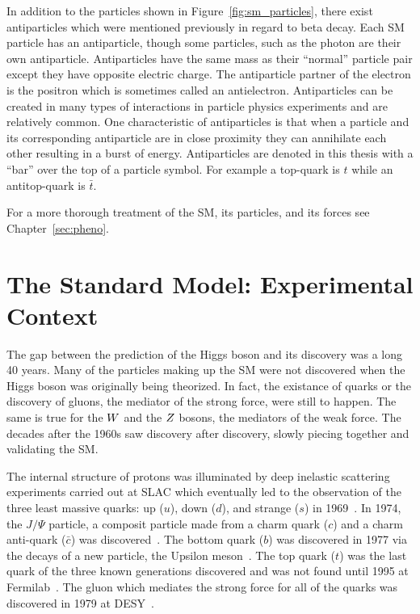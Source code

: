 In addition to the particles shown in Figure~\ref{fig:sm_particles}, there exist antiparticles
which were mentioned previously in regard to beta decay.
Each SM particle has an antiparticle, though some particles, such as the photon
are their own antiparticle. Antiparticles have the same mass as their
``normal'' particle pair except they have opposite electric charge. The antiparticle
partner of the electron is the positron which is sometimes called an antielectron.
Antiparticles can be created in many types of interactions in particle physics experiments
and are relatively common. One characteristic of antiparticles is that when a particle and its 
corresponding antiparticle are in close proximity they can annihilate each other resulting in
a burst of energy.
Antiparticles are denoted in this thesis with a ``bar'' over the top of a particle symbol. For example
a top-quark is $t$ while an antitop-quark is $\bar{t}$.

For a more thorough treatment of the SM, its particles, and its forces see
Chapter~\ref{sec:pheno}.



\section{The Standard Model: Experimental Context}
The gap between the prediction of the Higgs boson and its discovery was a long 40 years.
Many of the particles making up the SM were not discovered when the Higgs boson
was originally being theorized. In fact, the existance of quarks or the discovery 
of gluons, the mediator of the strong force, were still to happen. The same is true
for the $W$ and the $Z$ bosons, the mediators of the weak force. The decades after the
1960s saw discovery after discovery, slowly piecing together and validating
the SM.

The internal structure of protons was illuminated by
deep inelastic scattering experiments carried out at SLAC which eventually led to 
the observation of the three least massive quarks: up ($u$), down ($d$), and strange ($s$)
in 1969~\cite{PhysRevLett.23.930,Breidenbach:1969kd}. In 1974, the $J/\Psi$ particle, a composit 
particle made from a charm quark ($c$) and a charm anti-quark ($\bar{c}$) was 
discovered~\cite{PhysRevLett.33.1404,PhysRevLett.33.1406}. 
The bottom quark ($b$) was discovered in 1977 via the decays of a new particle, the Upsilon
meson~\cite{PhysRevLett.39.252}. The top quark ($t$) was the last quark of the three
known generations discovered
and was not found until 1995 at Fermilab~\cite{PhysRevLett.74.2626,PhysRevLett.74.2632}.
The gluon which mediates the strong force for all of the quarks was discovered in 
1979 at DESY~\cite{PhysRevLett.43.830}.

